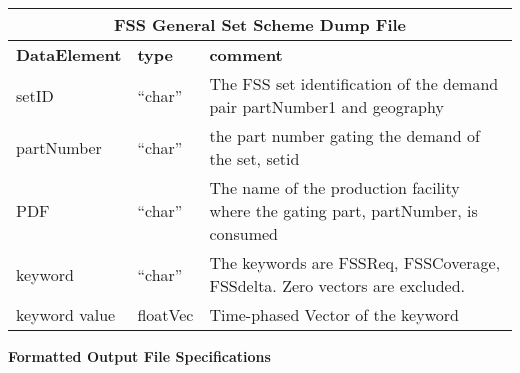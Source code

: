 \vspace{.5in}

\begin{tabular}{llp{4in}}
\multicolumn{3}{c}{{\bf FSS General Set Scheme Dump File}}\\ \hline\hline
{\bf DataElement} &  {\bf type}  &   {\bf comment} \\ \hline
setID & ``char'' & The FSS set identification of the demand pair partNumber1 
  and geography\\
partNumber & ``char'' & the part number gating the demand of the set, setid \\
PDF & ``char'' & The name of the production facility where the gating 
 part, partNumber, is consumed  \\
keyword & ``char''  & The keywords are FSSReq, FSSCoverage, FSSdelta.
    Zero vectors are excluded.\\
keyword value  & floatVec &  Time-phased Vector of the keyword 
\end{tabular}


\clearpage
\noindent
{\bf Formatted Output File Specifications}

\vspace{.5in}

